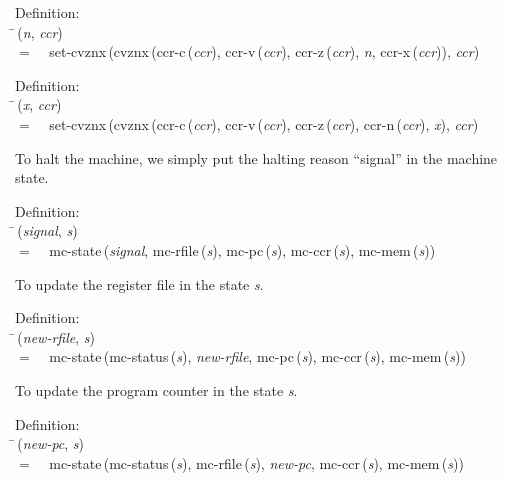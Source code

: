 \begin{tabbing}{\sc Definition}: \\  
\=\,({\it{n\/}}, {\it{ccr\/}}) \\ 
$=$$\;\;\;\;${\rm{set-cvznx}}\,({\rm{cvznx}}\,({\rm{ccr-c}}\,({\it{ccr\/}}), {\rm{ccr-v}}\,({\it{ccr\/}}), {\rm{ccr-z}}\,({\it{ccr\/}}), {\it{n\/}}, {\rm{ccr-x}}\,({\it{ccr\/}})), {\it{ccr\/}})\-
\end{tabbing}

\begin{tabbing}{\sc Definition}: \\  
\=\,({\it{x\/}}, {\it{ccr\/}}) \\ 
$=$$\;\;\;\;${\rm{set-cvznx}}\,({\rm{cvznx}}\,({\rm{ccr-c}}\,({\it{ccr\/}}), {\rm{ccr-v}}\,({\it{ccr\/}}), {\rm{ccr-z}}\,({\it{ccr\/}}), {\rm{ccr-n}}\,({\it{ccr\/}}), {\it{x\/}}), {\it{ccr\/}})\-
\end{tabbing}

 To halt the machine, we simply put the halting reason ``signal'' in
 the machine state.
\begin{tabbing}{\sc Definition}: \\  
\=\,({\it{signal\/}}, {\it{s\/}}) \\ 
$=$$\;\;\;\;${\rm{mc-state}}\,({\it{signal\/}}, {\rm{mc-rfile}}\,({\it{s\/}}), {\rm{mc-pc}}\,({\it{s\/}}), {\rm{mc-ccr}}\,({\it{s\/}}), {\rm{mc-mem}}\,({\it{s\/}}))\-
\end{tabbing}

 To update the register file in the state {\it{s\/}}.
\begin{tabbing}{\sc Definition}: \\  
\=\,({\it{new-rfile\/}}, {\it{s\/}}) \\ 
$=$$\;\;\;\;${\rm{mc-state}}\,({\rm{mc-status}}\,({\it{s\/}}), {\it{new-rfile\/}}, {\rm{mc-pc}}\,({\it{s\/}}), {\rm{mc-ccr}}\,({\it{s\/}}), {\rm{mc-mem}}\,({\it{s\/}}))\-
\end{tabbing}

 To update the program counter in the state {\it{s\/}}.
\begin{tabbing}{\sc Definition}: \\  
\=\,({\it{new-pc\/}}, {\it{s\/}}) \\ 
$=$$\;\;\;\;${\rm{mc-state}}\,({\rm{mc-status}}\,({\it{s\/}}), {\rm{mc-rfile}}\,({\it{s\/}}), {\it{new-pc\/}}, {\rm{mc-ccr}}\,({\it{s\/}}), {\rm{mc-mem}}\,({\it{s\/}}))\-
\end{tabbing}

